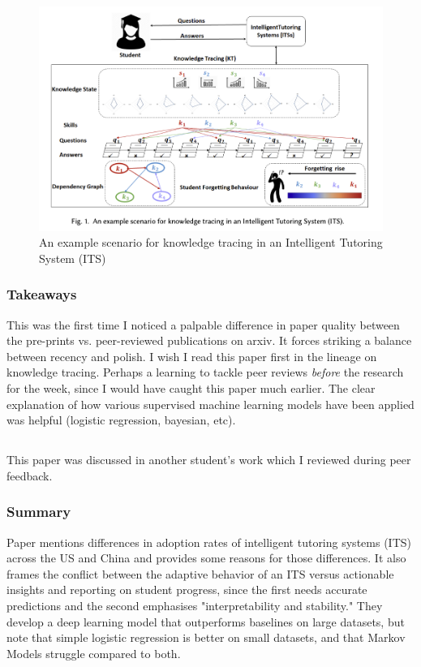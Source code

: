 \documentclass[
	letterpaper, %
]{jdf}
\begin{document}
\begin{figure}
    \centering
    \includegraphics[width=0.5\linewidth]{Assignments//Assignment 3/knowledge_tracing_survey.png}
    \caption{An example scenario for knowledge tracing in an Intelligent Tutoring System (ITS)}
    \label{fig:enter-label}
\end{figure}

\subsubsection{Takeaways}
This was the first time I noticed a palpable difference in paper quality between the pre-prints vs. peer-reviewed publications on arxiv. It forces striking a balance between recency and polish. I wish I read this paper first in the lineage on knowledge tracing. Perhaps a learning to tackle peer reviews \textit{before} the research for the week, since I would have caught this paper much earlier. The clear explanation of how various supervised machine learning models have been applied was helpful (logistic regression, bayesian, etc).

\subsection{}
This paper was discussed in another student's work which I reviewed during peer feedback.

\subsubsection{Summary}
Paper mentions differences in adoption rates of intelligent tutoring systems (ITS) across the US and China and provides some reasons for those differences. It also frames the conflict between the adaptive behavior of an ITS versus actionable insights and reporting on student progress, since the first needs accurate predictions and the second emphasises "interpretability and stability." They develop a deep learning model that outperforms baselines on large datasets, but note that simple logistic regression is better on small datasets, and that Markov Models struggle compared to both.
\end{document}
